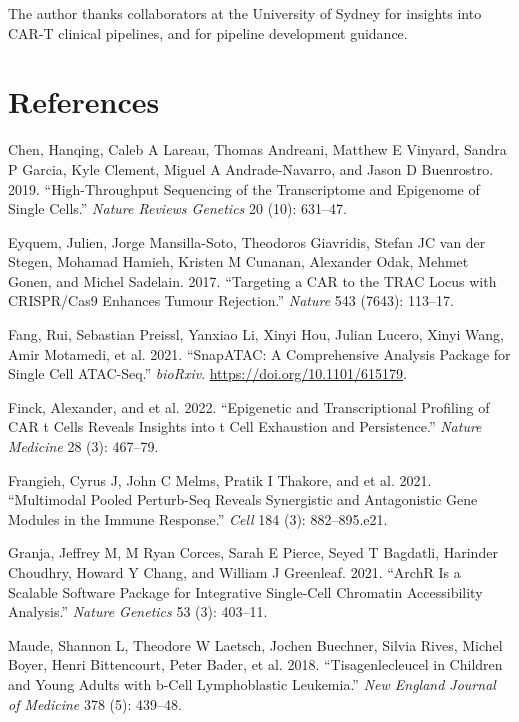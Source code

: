 \documentclass[
]{article}
\newlength{\cslhangindent}
\newenvironment{CSLReferences}[2] %
 {\begin{list}{}{%
  \setlength{\itemindent}{0pt}
  \setlength{\leftmargin}{0pt}
  \setlength{\parsep}{0pt}
  \ifodd #1
   \setlength{\leftmargin}{\cslhangindent}
   \setlength{\itemindent}{-1\cslhangindent}
  \fi
  \setlength{\itemsep}{#2\baselineskip}}}
 {\end{list}}
\begin{document}
The author thanks collaborators at the University of Sydney for insights
into CAR-T clinical pipelines, and for pipeline development guidance.

\section*{References}\label{references}

\protect{}\label{refs}
\begin{CSLReferences}{1}{0}
Chen, Hanqing, Caleb A Lareau, Thomas Andreani, Matthew E Vinyard,
Sandra P Garcia, Kyle Clement, Miguel A Andrade-Navarro, and Jason D
Buenrostro. 2019. {``High-Throughput Sequencing of the Transcriptome and
Epigenome of Single Cells.''} \emph{Nature Reviews Genetics} 20 (10):
631--47.

Eyquem, Julien, Jorge Mansilla-Soto, Theodoros Giavridis, Stefan JC van
der Stegen, Mohamad Hamieh, Kristen M Cunanan, Alexander Odak, Mehmet
Gonen, and Michel Sadelain. 2017. {``Targeting a CAR to the TRAC Locus
with CRISPR/Cas9 Enhances Tumour Rejection.''} \emph{Nature} 543 (7643):
113--17.

Fang, Rui, Sebastian Preissl, Yanxiao Li, Xinyi Hou, Julian Lucero,
Xinyi Wang, Amir Motamedi, et al. 2021. {``SnapATAC: A Comprehensive
Analysis Package for Single Cell ATAC-Seq.''} \emph{bioRxiv}.
\url{https://doi.org/10.1101/615179}.

Finck, Alexander, and et al. 2022. {``Epigenetic and Transcriptional
Profiling of CAR t Cells Reveals Insights into t Cell Exhaustion and
Persistence.''} \emph{Nature Medicine} 28 (3): 467--79.

Frangieh, Cyrus J, John C Melms, Pratik I Thakore, and et al. 2021.
{``Multimodal Pooled Perturb-Seq Reveals Synergistic and Antagonistic
Gene Modules in the Immune Response.''} \emph{Cell} 184 (3):
882--895.e21.

Granja, Jeffrey M, M Ryan Corces, Sarah E Pierce, Seyed T Bagdatli,
Harinder Choudhry, Howard Y Chang, and William J Greenleaf. 2021.
{``ArchR Is a Scalable Software Package for Integrative Single-Cell
Chromatin Accessibility Analysis.''} \emph{Nature Genetics} 53 (3):
403--11.

Maude, Shannon L, Theodore W Laetsch, Jochen Buechner, Silvia Rives,
Michel Boyer, Henri Bittencourt, Peter Bader, et al. 2018.
{``Tisagenlecleucel in Children and Young Adults with b-Cell
Lymphoblastic Leukemia.''} \emph{New England Journal of Medicine} 378
(5): 439--48.


\end{CSLReferences}
\end{document}
